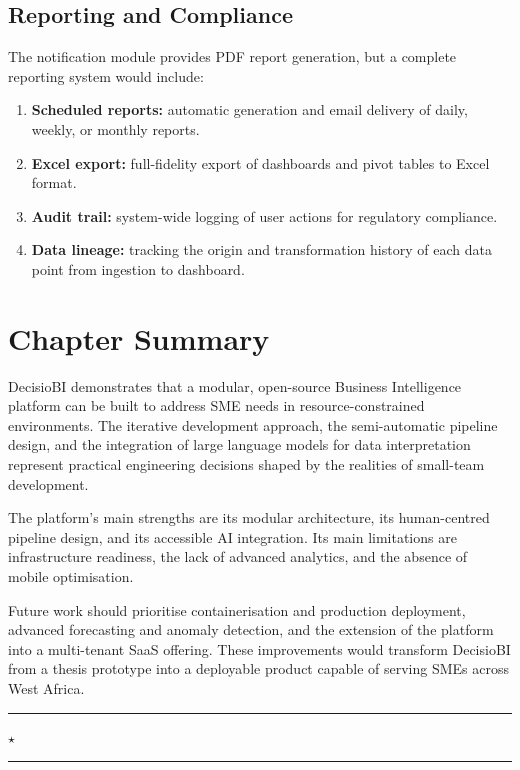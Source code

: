 \subsection{Reporting and Compliance}

\noindent
The notification module provides
PDF report generation,
but a complete reporting system would include:

\begin{enumerate}
  \item \textbf{Scheduled reports:}
        automatic generation and email delivery
        of daily, weekly, or monthly reports.
  \item \textbf{Excel export:}
        full-fidelity export of dashboards
        and pivot tables to Excel format.
  \item \textbf{Audit trail:}
        system-wide logging of user actions
        for regulatory compliance.
  \item \textbf{Data lineage:}
        tracking the origin and transformation
        history of each data point
        from ingestion to dashboard.
\end{enumerate}


\section{Chapter Summary}

\noindent
DecisioBI demonstrates that a modular,
open-source Business Intelligence platform
can be built to address SME needs
in resource-constrained environments.
The iterative development approach,
the semi-automatic pipeline design,
and the integration of large language models
for data interpretation
represent practical engineering decisions
shaped by the realities of small-team development.

\vspace{0.3cm}
\noindent
The platform's main strengths
are its modular architecture,
its human-centred pipeline design,
and its accessible AI integration.
Its main limitations
are infrastructure readiness,
the lack of advanced analytics,
and the absence of mobile optimisation.

\vspace{0.3cm}
\noindent
Future work should prioritise
containerisation and production deployment,
advanced forecasting and anomaly detection,
and the extension of the platform
into a multi-tenant SaaS offering.
These improvements would transform DecisioBI
from a thesis prototype
into a deployable product
capable of serving SMEs across West Africa.

\vspace{0.7cm}
\begin{center}
  \textcolor{BITred!40}{\rule{0.35\linewidth}{0.5pt}}
  \hspace{0.5em}
  \textcolor{BITred}{$\star$}
  \hspace{0.5em}
  \textcolor{BITred!40}{\rule{0.35\linewidth}{0.5pt}}
\end{center}
